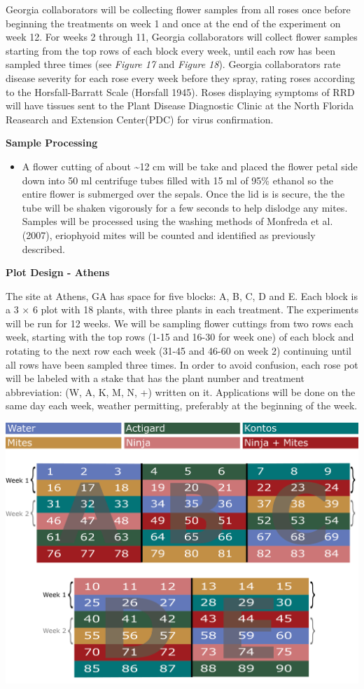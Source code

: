 \documentclass[12pt,final,CPage]{ufthesis}
\begin{document}
{  Georgia collaborators will be collecting flower samples from all roses once before beginning the treatments on week 1 and once at the end of the experiment on week 12. For weeks 2 through 11, Georgia collaborators will collect flower samples starting from the top rows of each block every week, until each row has been sampled three times (see \emph{Figure 17} and \emph{Figure 18}). Georgia collaborators rate disease severity for each rose every week before they spray, rating roses according to the Horsfall-Barratt Scale (Horsfall 1945). Roses displaying symptoms of RRD will have tissues sent to the Plant Disease Diagnostic Clinic at the North Florida Reasearch and Extension Center(PDC) for virus confirmation.

  \textbf{Sample Processing}
  \begin{itemize}
  \tightlist
  \item
    A flower cutting of about \textasciitilde12 cm will be take and placed the flower petal side down into 50 ml centrifuge tubes filled with 15 ml of 95\% ethanol so the entire flower is submerged over the sepals. Once the lid is is secure, the the tube will be shaken vigorously for a few seconds to help dislodge any mites. Samples will be processed using the washing methods of Monfreda et al. (2007), eriophyoid mites will be counted and identified as previously described.
  \end{itemize}
  \textbf{Plot Design - Athens}

  The site at Athens, GA has space for five blocks: A, B, C, D and E. Each block is a 3 \(\times\) 6 plot with 18 plants, with three plants in each treatment. The experiments will be run for 12 weeks. We will be sampling flower cuttings from two rows each week, starting with the top rows (1-15 and 16-30 for week one) of each block and rotating to the next row each week (31-45 and 46-60 on week 2) continuing until all rows have been sampled three times. In order to avoid confusion, each rose pot will be labeled with a stake that has the plant number and treatment abbreviation: (W, A, K, M, N, +) written on it. Applications will be done on the same day each week, weather permitting, preferably at the beginning of the week.
  \begin{center}\includegraphics[width=0.8\linewidth]{figure/rrv_ipm_plot_map_2019_athens} \end{center}

}
\end{document}
